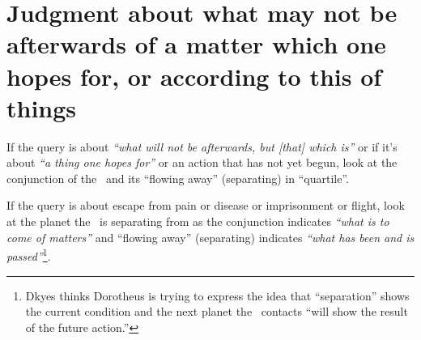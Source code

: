 \section{Judgment about what may not be afterwards of a matter which one hopes for, or according to this of things}
If the query is about \textsl{``what will not be afterwards, but [that] which is''} or if it's about \textsl{``a thing one hopes for''} or an action that has not yet begun, look at the conjunction of the \Moon\, and its ``flowing away'' (separating) in ``quartile''.

If the query is about escape from pain or disease or imprisonment or flight, look at the planet the \Moon\, is separating from as the conjunction indicates \textsl{``what is to come of matters''} and ``flowing away'' (separating) indicates \textsl{``what has been and is passed''}\footnote{Dkyes thinks Dorotheus is trying to express the idea that ``separation'' shows the current condition and the next planet the \Moon\, contacts ``will show the result of the future action.''}.

